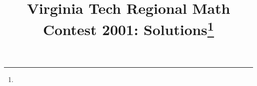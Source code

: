 \documentclass[10pt]{article}
\begin{document}
\title{Virginia Tech Regional Math Contest 2001: Solutions\footnote{\disclaimer}}
\author{\vspace{-2ex}}
\date{\vspace{-5ex}} %
\maketitle

%

%

%

%

%

%

%
\end{document}
